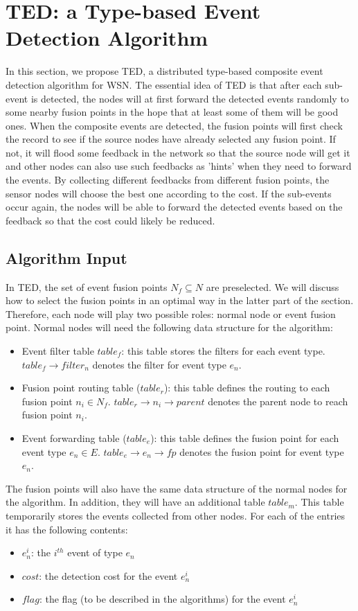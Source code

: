 \section{TED: a Type-based Event Detection Algorithm}
\label{sec:ted}
In this section, we propose TED, a distributed type-based composite event detection algorithm for WSN. The essential idea of TED is that after each sub-event is detected, the nodes will at first forward the detected events randomly to some nearby fusion points in the hope that at least some of them will be good ones. When the composite events are detected, the fusion points will first check the record to see if the source nodes have already selected any fusion point. If not, it will flood some feedback in the network so that the source node will get it and other nodes can also use such feedbacks as 'hints' when they need to forward the events. By collecting different feedbacks from different fusion points, the sensor nodes will choose the best one according to the cost. If the sub-events occur again, the nodes will be able to forward the detected events based on the feedback so that the cost could likely be reduced.

\subsection{Algorithm Input}
In TED, the set of event fusion points \(N_f\subseteq N\) are preselected. We will discuss how to select the fusion points in an optimal way in the latter part of the section. Therefore, each node will play two possible roles: normal node or event fusion point. Normal nodes will need the following data structure for the algorithm:
\begin{itemize}
\item Event filter table \(table_f\): this table stores the filters for each event type. \(table_f\rightarrow filter_n\) denotes the filter for event type \(e_n\).
\item Fusion point routing table (\(table_r\)): this table defines the routing to each fusion point \(n_i\in N_f\). \(table_r\rightarrow n_i\rightarrow parent\) denotes the parent node to reach fusion point \(n_i\).
\item Event forwarding table (\(table_e\)): this table defines the fusion point for each event type \(e_n\in E\). \(table_e\rightarrow e_n\rightarrow fp\) denotes the fusion point for event type \(e_n\).
\end{itemize}

The fusion points will also have the same data structure of the normal nodes for the algorithm. In addition, they will have an additional table \(table_m\). This table temporarily stores the events collected from other nodes. For each of the entries it has the following contents: 
\begin{itemize}
\item \(e^i_n\): the \(i^{th}\) event of type \(e_n\)
\item \(cost\): the detection cost for the event \(e^i_n\)
\item \(flag\): the flag (to be described in the algorithms) for the event \(e^i_n\)
\end{itemize}

